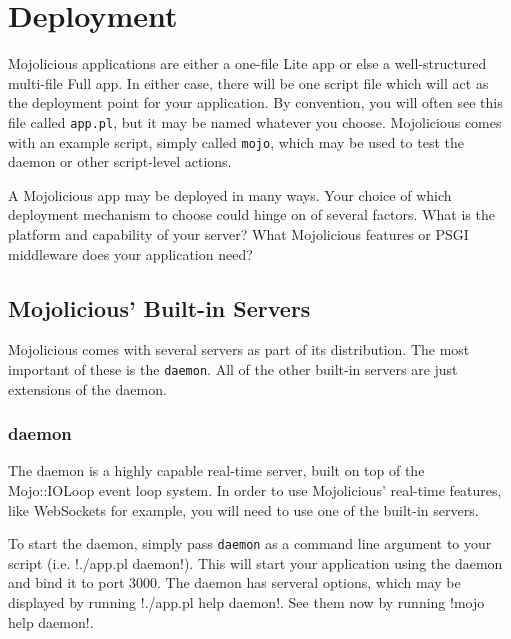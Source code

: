 
\section{Deployment}

Mojolicious applications are either a one-file Lite app
or else a well-structured multi-file Full app.
In either case, there will be one script file which will act as the deployment point for your application.
By convention, you will often see this file called \verb!app.pl!, but it may be named whatever you choose.
Mojolicious comes with an example script, simply called \verb!mojo!, which may be used to test the daemon or other script-level actions.

A Mojolicious app may be deployed in many ways.
Your choice of which deployment mechanism to choose could hinge on of several factors.
What is the platform and capability of your server?
What Mojolicious features or PSGI middleware does your application need?

\subsection{Mojolicious' Built-in Servers}

Mojolicious comes with several servers as part of its distribution.
The most important of these is the \verb!daemon!.
All of the other built-in servers are just extensions of the daemon.

\subsubsection{daemon}

The daemon is a highly capable real-time server, built on top of the Mojo::IOLoop event loop system.
In order to use Mojolicious' real-time features, like WebSockets for example,
you will need to use one of the built-in servers.

To start the daemon, simply pass \verb!daemon! as a command line argument to your script (i.e. \lstbash!./app.pl daemon!). 
This will start your application using the daemon and bind it to port 3000.
The daemon has serveral options, which may be displayed by running \lstbash!./app.pl help daemon!.
See them now by running \lstbash!mojo help daemon!.

